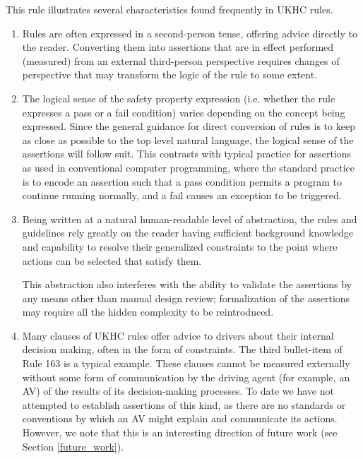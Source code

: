 This rule illustrates several characteristics found frequently in UKHC rules.
\begin{enumerate}
    \item Rules are often expressed in a second-person tense, offering advice directly to the reader. Converting them into assertions that are in effect performed (measured) from an external third-person perspective requires changes of perspective that may transform the logic of the rule to some extent.
    \item The logical sense of the safety property expression (i.e. whether the rule expresses a pass or a fail condition) varies depending on the concept being expressed. Since the general guidance for direct conversion of rules is to keep as close as possible to the top level natural language, the logical sense of the assertions will follow suit. This contrasts with typical practice for assertions as used in conventional computer programming, where the standard practice is to encode an assertion such that a pass condition permits a program to continue running normally, and a fail causes an exception to be triggered.
    \item Being written at a natural human-readable level of abstraction, the rules and guidelines rely greatly on the reader having sufficient background knowledge and capability to resolve their generalized constraints to the point where actions can be selected that satisfy them.
    
    This abstraction also interferes with the ability to validate the assertions by any means other than manual design review; formalization of the assertions may require all the hidden complexity to be reintroduced.
    \item Many clauses of UKHC rules offer advice to drivers about their internal decision making, often in the form of constraints. The third bullet-item of Rule 163 is a typical example. These clauses cannot be measured externally without some form of communication by the driving agent (for example, an AV) of the results of its decision-making processes. To date we have not attempted to establish assertions of this kind, as there are no standards or conventions by which an AV might explain and communicate its actions. However, we note that this is an interesting direction of future work (see Section \ref{future_work}). 
\end{enumerate}

